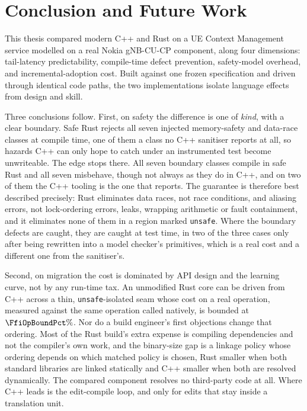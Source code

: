 \chapter{Conclusion and Future Work\label{chapter:conclusions}}

This thesis compared modern C++ and Rust on a UE Context Management service modelled on a real
Nokia gNB-CU-CP component, along four dimensions: tail-latency predictability, compile-time
defect prevention, safety-model overhead, and incremental-adoption cost. Built against one frozen
specification and driven through identical code paths, the two implementations isolate language
effects from design and skill.

Three conclusions follow. First, on safety the difference is one of \emph{kind}, with a clear
boundary. Safe Rust rejects all seven injected memory-safety and data-race classes at compile
time, one of them a class no C++ sanitiser reports at all, so hazards C++ can only hope to catch
under an instrumented test become unwriteable. The edge stops there. All seven boundary classes
compile in safe Rust and all seven misbehave, though not always as they do in C++, and on two of
them the C++ tooling is the one that reports. The guarantee is therefore best described precisely:
Rust eliminates data races, not race conditions, and aliasing errors, not lock-ordering errors,
leaks, wrapping arithmetic or fault containment, and it eliminates none of them in a region marked
\texttt{unsafe}. Where the boundary defects are caught, they are caught at test time, in two of
the three cases only after being rewritten into a model checker's primitives, which is a real cost
and a different one from the sanitiser's.

Second, on migration the cost is dominated by API design and the learning curve, not by any
run-time tax. An unmodified Rust core can be driven from C++ across a thin,
\texttt{unsafe}-isolated seam whose cost on a real operation, measured against the same operation
called natively, is bounded at $\FfiOpBoundPct\%$. Nor do a build engineer's first objections
change that ordering. Most of the Rust build's extra expense is compiling dependencies and not the
compiler's own work, and the binary-size gap is a linkage policy whose ordering depends on which
matched policy is chosen, Rust smaller when both standard libraries are linked statically and C++
smaller when both are resolved dynamically. The compared component resolves no third-party code at
all. Where C++ leads is the edit-compile loop, and only for edits that stay inside a translation
unit.


